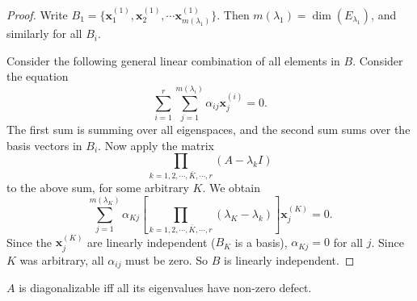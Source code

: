 \documentclass[a4paper]{article}
\begin{document}
  \begin{proof}
    Write $B_1 = \{\mathbf{x}_1^{(1)}, \mathbf{x}_2^{(1)}, \cdots \mathbf{x}_{m(\lambda_1)}^{(1)}\}$. Then $m(\lambda_1) = \dim (E_{\lambda_1})$, and similarly for all $B_i$.

    Consider the following general linear combination of all elements in $B$. Consider the equation
    \[
      \sum_{i = 1}^r\sum_{j = 1}^{m(\lambda_i)} \alpha_{ij} \mathbf{x}_j^{(i)} = 0.
    \]
    The first sum is summing over all eigenspaces, and the second sum sums over the basis vectors in $B_i$. Now apply the matrix
    \[
      \prod_{k = 1, 2, \cdots, \bar{K}, \cdots, r} (A - \lambda_kI)
    \]
    to the above sum, for some arbitrary $K$. We obtain
    \[
      \sum_{j = 1}^{m(\lambda_K)}\alpha_{Kj}\left[\prod_{k = 1, 2, \cdots, \bar{K}, \cdots, r}(\lambda_K - \lambda_k)\right]\mathbf{x}_j^{(K)} = 0.
    \]
    Since the $\mathbf{x}^{(K)}_j$ are linearly independent ($B_K$ is a basis), $\alpha_{Kj} = 0$ for all $j$. Since $K$ was arbitrary, all $\alpha_{ij}$ must be zero. So $B$ is linearly independent.
  \end{proof}

  \begin{prop}
    $A$ is diagonalizable iff all its eigenvalues have non-zero defect.
  \end{prop}
\end{document}
